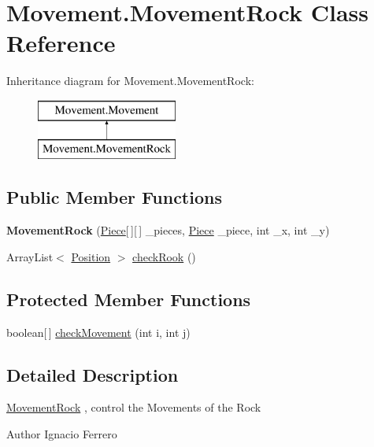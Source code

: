 \hypertarget{class_movement_1_1_movement_rock}{\section{Movement.\-Movement\-Rock Class Reference}
\label{class_movement_1_1_movement_rock}
}
Inheritance diagram for Movement.\-Movement\-Rock\-:\begin{figure}[H]
\begin{center}
\leavevmode
\includegraphics[height=2.000000cm]{class_movement_1_1_movement_rock}
\end{center}
\end{figure}
\subsection*{Public Member Functions}
\begin{DoxyCompactItemize}
\item 
\hypertarget{class_movement_1_1_movement_rock_a1679e753f28043c9478a4d16e8847353}{{\bfseries Movement\-Rock} (\hyperlink{class_basic___objects_1_1_piece}{Piece}\mbox{[}$\,$\mbox{]}\mbox{[}$\,$\mbox{]} \-\_\-pieces, \hyperlink{class_basic___objects_1_1_piece}{Piece} \-\_\-piece, int \-\_\-x, int \-\_\-y)}\label{class_movement_1_1_movement_rock_a1679e753f28043c9478a4d16e8847353}

\item 
Array\-List$<$ \hyperlink{class_basic___objects_1_1_position}{Position} $>$ \hyperlink{class_movement_1_1_movement_rock_a8a640abbb5f0d5c61018fc819c5a9e0b}{check\-Rook} ()
\end{DoxyCompactItemize}
\subsection*{Protected Member Functions}
\begin{DoxyCompactItemize}
\item 
boolean\mbox{[}$\,$\mbox{]} \hyperlink{class_movement_1_1_movement_rock_a9be70803c1f6e816295c11a341e04f15}{check\-Movement} (int i, int j)
\end{DoxyCompactItemize}


\subsection{Detailed Description}
\hyperlink{class_movement_1_1_movement_rock}{Movement\-Rock} , control the Movements of the Rock \begin{DoxyAuthor}{Author}
Ignacio Ferrero 
\end{DoxyAuthor}


